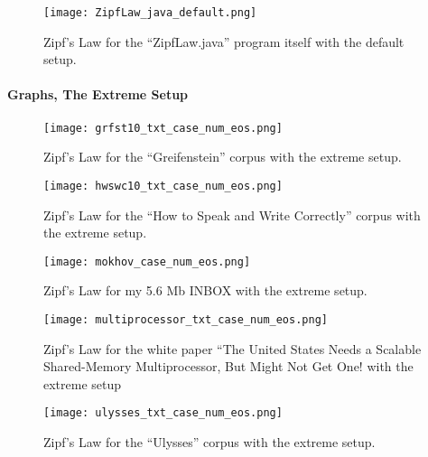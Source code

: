 \begin{figure}
    \begin{center}
    \texttt{[image: ZipfLaw\_java\_default.png]}
    \caption{Zipf's Law for the ``ZipfLaw.java'' program itself with the default setup.}
    \end{center}
\end{figure}


\clearpage

\paragraph{Graphs, The Extreme Setup}

\begin{figure}[h!]
    \begin{center}
    \texttt{[image: grfst10\_txt\_case\_num\_eos.png]}
    \caption{Zipf's Law for the ``Greifenstein'' corpus with the extreme setup.}
    \end{center}
\end{figure}

\begin{figure}
    \begin{center}
    \texttt{[image: hwswc10\_txt\_case\_num\_eos.png]}
    \caption{Zipf's Law for the ``How to Speak and Write Correctly'' corpus with the extreme setup.}
    \end{center}
\end{figure}

\begin{figure}
    \begin{center}
    \texttt{[image: mokhov\_case\_num\_eos.png]}
    \caption{Zipf's Law for my 5.6 Mb INBOX  with the extreme setup.}
    \end{center}
\end{figure}

\begin{figure}
	\begin{center}
	\texttt{[image: multiprocessor\_txt\_case\_num\_eos.png]}
	\caption{Zipf's Law for the white paper ``The United States Needs a Scalable Shared-Memory Multiprocessor, But Might Not Get One! with the extreme setup}
	\end{center}
\end{figure}

\begin{figure}
	\begin{center}
	\texttt{[image: ulysses\_txt\_case\_num\_eos.png]}
	\caption{Zipf's Law for the ``Ulysses'' corpus with the extreme setup.}
	\end{center}
\end{figure}

